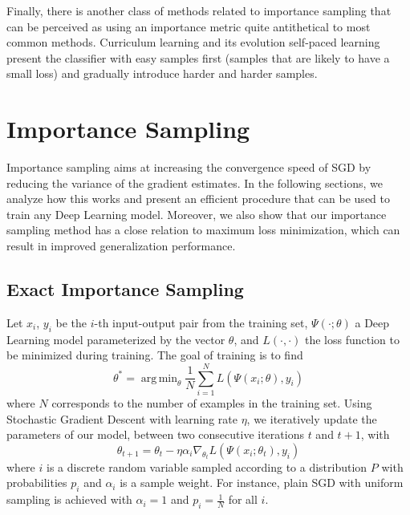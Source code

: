 \documentclass{article}
\DeclareMathOperator*{\argmin}{arg\,min}
\begin{document}
Finally, there is another class of methods related to importance sampling that
can be perceived as using an importance metric quite antithetical to most
common methods. Curriculum learning \cite{bengio2009curriculum} and its
evolution self-paced learning \cite{kumar2010self} present the classifier with
easy samples first (samples that are likely to have a small loss) and gradually
introduce harder and harder samples.

\section{Importance Sampling}

Importance sampling aims at increasing the convergence speed of SGD by reducing
the variance of the gradient estimates. In the following sections, we analyze
how this works and present an efficient procedure that can be used to train any
Deep Learning model. Moreover, we also show that our importance sampling method
has a close relation to maximum loss minimization, which can result in improved
generalization performance.

\subsection{Exact Importance Sampling}

Let $x_i$, $y_i$ be the $i$-th input-output pair from the training set, $\Psi(\cdot;
\theta)$ a Deep Learning model parameterized by the vector $\theta$, and
$L(\cdot, \cdot)$ the loss function to be minimized during training.
%
The goal of training is to find
\begin{equation}
\theta^* = \argmin_\theta \frac{1}{N} \sum_{i=1}^N L(\Psi(x_i; \theta), y_i)
\end{equation}
where $N$ corresponds to the number of examples in the training set. Using
Stochastic Gradient Descent with learning rate $\eta$, we iteratively update
the parameters of our model, between two consecutive iterations $t$ and $t+1$,
with
\begin{equation}
\theta_{t+1} = \theta_t - \eta \alpha_i \nabla_{\theta_t} L(\Psi(x_i; \theta_t), y_i)
\end{equation}
where $i$ is a discrete random variable sampled according to a distribution $P$
with probabilities $p_i$ and $\alpha_i$ is a sample weight. For instance, plain SGD with
uniform sampling is achieved with $\alpha_i = 1$ and $p_i = \frac{1}{N}$ for all $i$.
\end{document}
